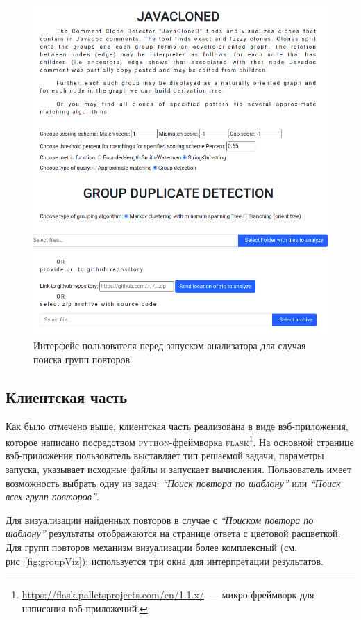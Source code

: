 \begin{figure}[h!]
    \centering
    \includegraphics[width=1.3\columnwidth,angle=90]{Mishin/figures/startApp.png}
    \caption{Интерфейс пользователя перед запуском анализатора для случая поиска групп повторов}\label{fig:startApp}
\end{figure}

\subsection{Клиентская часть}\label{clinet}
Как было отмечено выше, клиентская часть реализована в виде вэб-приложения, которое написано посредством \textsc{python}-фреймворка \textsc{flask}\footnote{\url{https://flask.palletsprojects.com/en/1.1.x/}~--- микро-фреймворк для написания вэб-приложений.}.
На основной странице вэб-приложения пользователь выставляет тип решаемой задачи, параметры запуска, указывает исходные файлы и запускает вычисления.
Пользователь имеет возможность выбрать одну из задач: \emph{``Поиск повтора по шаблону''} или \emph{``Поиск всех групп повторов''}.

Для визуализации найденных повторов в случае с  \emph{``Поиском повтора по шаблону''} результаты отображаются на странице ответа с цветовой расцветкой.
Для групп повторов механизм визуализации более комплексный (см. рис~\ref{fig:groupViz}): используется три окна для интерпретации результатов.

